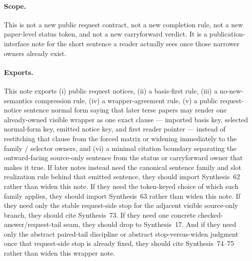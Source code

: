 \documentclass[11pt]{article}
\begin{document}
\paragraph{Scope.}
This is not a new public request contract, not a new completion rule, not a new paper-level status token, and not a new carryforward verdict.
It is a publication-interface note for the short sentence a reader actually sees once those narrower owners already exist.

\paragraph{Exports.}
This note exports (i) public request notices, (ii) a basis-first rule, (iii) a no-new-semantics compression rule, (iv) a wrapper-agreement rule, (v) a public request-notice sentence normal form saying that later terse papers may render one already-owned visible wrapper as one exact clause --- imported basis key, selected normal-form key, emitted notice key, and first reader pointer --- instead of restitching that clause from the forced matrix or widening immediately to the family / selector owners, and (vi) a minimal citation boundary separating the outward-facing source-only sentence from the status or carryforward owner that makes it true. If later notes instead need the canonical sentence family and slot realization rule behind that emitted sentence, they should import Synthesis~62 rather than widen this note. If they need the token-keyed choice of which such family applies, they should import Synthesis~63 rather than widen this note. If they need only the stable request-side stop for the adjacent visible source-only branch, they should cite Synthesis~73. If they need one concrete checked-answer/request-tail seam, they should drop to Synthesis~17. And if they need only the abstract paired-tail discipline or abstract stop-versus-widen judgment once that request-side stop is already fixed, they should cite Synthesis~74--75 rather than widen this wrapper note.
\end{document}
